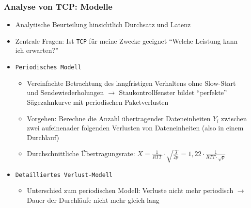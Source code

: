 \subsubsection{Analyse von TCP: Modelle}
\begin{itemize}
	\item Analytische Beurteilung hinsichtlich Durchsatz und Latenz
	\item Zentrale Fragen: Ist \texttt{TCP} für meine Zwecke geeignet "`Welche Leistung kann ich erwarten?"'
	\item \texttt{Periodisches Modell}
	\begin{itemize}
		\item Vereinfachte Betrachtung des langfristigen Verhaltens ohne Slow-Start und Sendewiederholungen \(\rightarrow\) Staukontrollfenster bildet "`perfekte"' Sägezahnkurve mit periodischen Paketverlusten
		\item Vorgehen: Berechne die Anzahl übertragender Dateneinheiten \(Y_i\) zwischen zwei aufeinenader folgenden Verlusten von Dateneinheiten (also in einem Durchlauf)
		\item Durchschnittliche Übertragungsrate: \(X=\frac{1}{RTT}\cdot\sqrt{\frac{3}{2p}} = 1,22 \cdot \frac{1}{RTT\cdot\sqrt{p}}\)
	\end{itemize}
	\item \texttt{Detailliertes Verlust-Modell}
	\begin{itemize}
		\item Unterschied zum periodischen Modell: Verluste nicht mehr periodisch \(\rightarrow\) Dauer der Durchläufe nicht mehr gleich lang
	\end{itemize}
\end{itemize}


